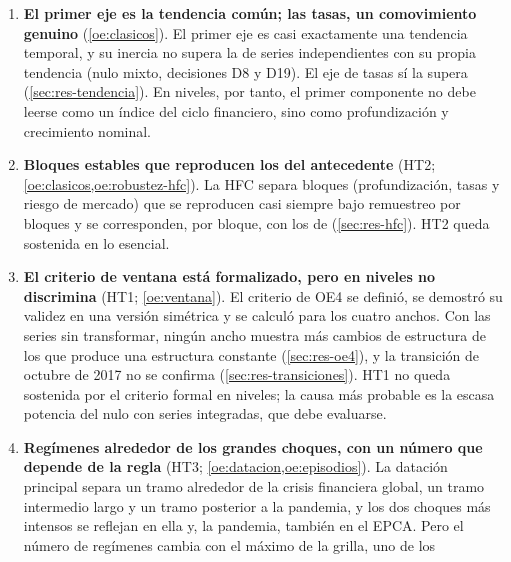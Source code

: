 \begin{enumerate}[label=\textbf{C\arabic*.}, ref=C\arabic*, leftmargin=*]
    El PCA de las series sin transformar tiene tres ejes con lectura económica clara:
    profundización, tasas de interés de corto plazo y riesgo de mercado; los tres son
    descriptivamente estables bajo remuestreo y el cuarto no lo es (\cref{sec:res-pca}). Los
    criterios de retención no coinciden en el tercer eje, de modo que $d=3$, fijado de antemano
    (decisión D9), se sostiene con esa salvedad.
  \item\label{conc:tendencia} \textbf{El primer eje es la tendencia común; las tasas, un
    comovimiento genuino} (\cref{oe:clasicos}). El primer eje es casi exactamente una tendencia
    temporal, y su inercia no supera la de series independientes con su propia tendencia (nulo
    mixto, decisiones D8 y D19). El eje de tasas sí la supera (\cref{sec:res-tendencia}). En
    niveles, por tanto, el primer componente no debe leerse como un índice del ciclo financiero,
    sino como profundización y crecimiento nominal.
  \item\label{conc:hfc} \textbf{Bloques estables que reproducen los del antecedente} (HT2;
    \cref{oe:clasicos,oe:robustez-hfc}). La HFC separa \clasesHfcMenor{} bloques (profundización,
    tasas y riesgo de mercado) que se reproducen casi siempre bajo remuestreo por bloques y se
    corresponden, por bloque, con los de \textcite{camiz_cerda_atoche_2026}
    (\cref{sec:res-hfc}). HT2 queda sostenida en lo esencial.
  \item\label{conc:oe4} \textbf{El criterio de ventana está formalizado, pero en niveles no
    discrimina} (HT1; \cref{oe:ventana}). El criterio de OE4 se definió, se demostró su validez en
    una versión simétrica y se calculó para los cuatro anchos. Con las series sin transformar,
    ningún ancho muestra más cambios de estructura de los que produce una estructura constante
    (\cref{sec:res-oe4}), y la transición de octubre de 2017 no se confirma
    (\cref{sec:res-transiciones}). HT1 no queda sostenida por el criterio formal en niveles; la
    causa más probable es la escasa potencia del nulo con series integradas, que debe evaluarse.
  \item\label{conc:datacion} \textbf{Regímenes alrededor de los grandes choques, con un número
    que depende de la regla} (HT3; \cref{oe:datacion,oe:episodios}). La datación principal separa
    un tramo alrededor de la crisis financiera global, un tramo intermedio largo y un tramo
    posterior a la pandemia, y los dos choques más intensos se reflejan en ella y, la pandemia,
    también en el EPCA. Pero el número de regímenes cambia con el máximo de la grilla, uno de los

\end{enumerate}
